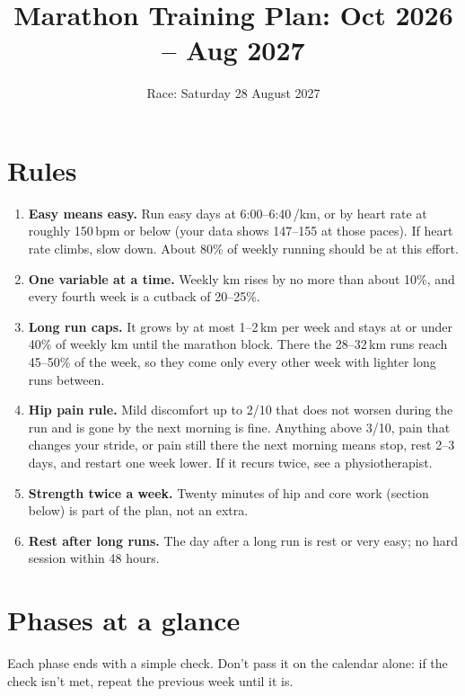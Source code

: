 \documentclass[11pt,a4paper]{article}
\title{Marathon Training Plan: Oct 2026 -- Aug 2027}
\date{Race: Saturday 28 August 2027}
\author{}
\begin{document}
\maketitle
\vspace{-1.5em}

\section*{Rules}

\begin{enumerate}
  \item \textbf{Easy means easy.} Run easy days at 6:00--6:40\,/km, or by heart
  rate at roughly 150\,bpm or below (your data shows 147--155 at those paces).
  If heart rate climbs, slow down. About 80\% of weekly running should be at
  this effort.
  \item \textbf{One variable at a time.} Weekly km rises by no more than about
  10\%, and every fourth week is a cutback of 20--25\%.
  \item \textbf{Long run caps.} It grows by at most 1--2\,km per week and stays
  at or under 40\% of weekly km until the marathon block. There the 28--32\,km
  runs reach 45--50\% of the week, so they come only every other week with
  lighter long runs between.
  \item \textbf{Hip pain rule.} Mild discomfort up to 2/10 that does not worsen
  during the run and is gone by the next morning is fine. Anything above 3/10,
  pain that changes your stride, or pain still there the next morning means
  stop, rest 2--3 days, and restart one week lower. If it recurs twice, see a
  physiotherapist.
  \item \textbf{Strength twice a week.} Twenty minutes of hip and core work
  (section below) is part of the plan, not an extra.
  \item \textbf{Rest after long runs.} The day after a long run is rest or very
  easy; no hard session within 48 hours.
\end{enumerate}


\section*{Phases at a glance}

Each phase ends with a simple check. Don't pass it on the calendar alone: if the check isn't met, repeat the previous week until it is.
\end{document}
